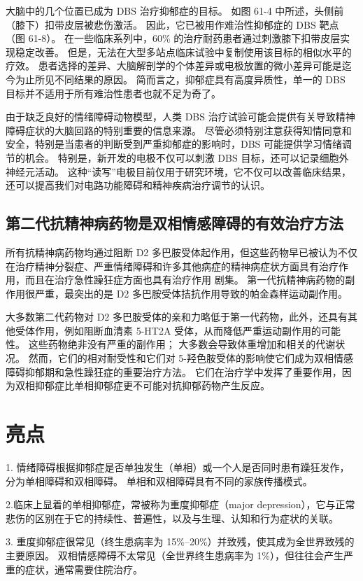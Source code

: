 大脑中的几个位置已成为 DBS 治疗抑郁症的目标。 如图 61-4 中所述，头侧前（膝下）扣带皮层被悲伤激活。 因此，它已被用作难治性抑郁症的 DBS 靶点（图 61-8）。 在一些临床系列中，60\% 的治疗耐药患者通过刺激膝下扣带皮层实现稳定改善。 但是，无法在大型多站点临床试验中复制使用该目标的相似水平的疗效。 患者选择的差异、大脑解剖学的个体差异或电极放置的微小差异可能是迄今为止所见不同结果的原因。 简而言之，抑郁症具有高度异质性，单一的 DBS 目标并不适用于所有难治性患者也就不足为奇了。

由于缺乏良好的情绪障碍动物模型，人类 DBS 治疗试验可能会提供有关导致精神障碍症状的大脑回路的特别重要的信息来源。 尽管必须特别注意获得知情同意和安全，特别是当患者的判断受到严重抑郁症的影响时，DBS 可能提供学习情绪调节的机会。 特别是，新开发的电极不仅可以刺激 DBS 目标，还可以记录细胞外神经元活动。 这种“读写”电极目前仅用于研究环境，它不仅可以改善临床结果，还可以提高我们对电路功能障碍和精神疾病治疗调节的认识。

\subsection{第二代抗精神病药物是双相情感障碍的有效治疗方法}

所有抗精神病药物均通过阻断 D2 多巴胺受体起作用，但这些药物早已被认为不仅在治疗精神分裂症、严重情绪障碍和许多其他病症的精神病症状方面具有治疗作用，而且在治疗急性躁狂症方面也具有治疗作用 剧集。 第一代抗精神病药物的副作用很严重，最突出的是 D2 多巴胺受体拮抗作用导致的帕金森样运动副作用。

大多数第二代药物对 D2 多巴胺受体的亲和力略低于第一代药物，此外，还具有其他受体作用，例如阻断血清素 5-HT2A 受体，从而降低严重运动副作用的可能性。 这些药物绝非没有严重的副作用； 大多数会导致体重增加和相关的代谢状况。 然而，它们的相对耐受性和它们对 5-羟色胺受体的影响使它们成为双相情感障碍抑郁期和急性躁狂症的重要治疗方法。 它们在治疗学中发挥了重要作用，因为双相抑郁症比单相抑郁症更不可能对抗抑郁药物产生反应。

\section{亮点}

1. 情绪障碍根据抑郁症是否单独发生（单相）或一个人是否同时患有躁狂发作，分为单相障碍和双相障碍。 单相和双相障碍具有不同的家族传播模式。 

2.临床上显着的单相抑郁症，常被称为重度抑郁症（major depression），它与正常悲伤的区别在于它的持续性、普遍性，以及与生理、认知和行为症状的关联。 

3. 重度抑郁症很常见（终生患病率为 15\%–20\%）并致残，使其成为全世界致残的主要原因。 双相情感障碍不太常见（全世界终生患病率为 1\%），但往往会产生严重的症状，通常需要住院治疗。 


